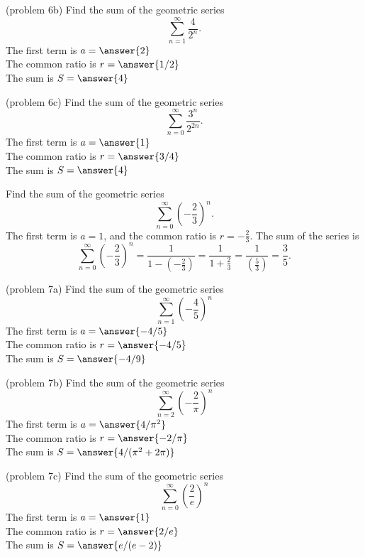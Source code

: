 \documentclass[handout]{ximera}
\begin{document}
\begin{problem}(problem 6b)
Find the sum of the geometric series 
\[
\sum_{n=1}^\infty \frac{4}{2^n}.
\]
The first term is $a = \answer{2}$\\
The common ratio is $r = \answer{1/2}$\\
The sum is $S= \answer{4}$

\end{problem}

\begin{problem}(problem 6c)
Find the sum of the geometric series 
\[
\sum_{n=0}^\infty \frac{3^n}{2^{2n}}.
\]
The first term is $a = \answer{1}$\\
The common ratio is $r = \answer{3/4}$\\
The sum is $S= \answer{4}$

\end{problem}



\begin{example}[example 7]
Find the sum of the geometric series 
\[
\sum_{n=0}^\infty \left(-\frac23\right)^n.
\]
The first term is $a = 1$, and the common ratio is $r = -\frac23$. The sum of the series is
\[
\sum_{n=0}^\infty \left(-\frac23\right)^n = \frac{1}{1-\left(-\frac23\right)} = \frac{1}{1 + \frac23} = \frac{1}{\left(\frac53\right)} = \frac35.
\]
\end{example}

\begin{problem}(problem 7a)
Find the sum of the geometric series 
\[
\sum_{n=1}^\infty \left(-\frac45\right)^n
\]
The first term is $a = \answer{-4/5}$\\
The common ratio is $r = \answer{-4/5}$\\
The sum is $S= \answer{-4/9}$

\end{problem}


\begin{problem}(problem 7b)
Find the sum of the geometric series 
\[
\sum_{n=2}^\infty \left(-\frac{2}{\pi}\right)^n
\]
The first term is $a = \answer{4/\pi^2}$\\
The common ratio is $r = \answer{-2/\pi}$\\
The sum is $S= \answer{4/(\pi^2 + 2\pi)}$

\end{problem}

\begin{problem}(problem 7c)
Find the sum of the geometric series 
\[
\sum_{n=0}^\infty \left(\frac{2}{e}\right)^n
\]
The first term is $a = \answer{1}$\\
The common ratio is $r = \answer{2/e}$\\
The sum is $S= \answer{e/(e-2)}$

\end{problem}
\end{document}
